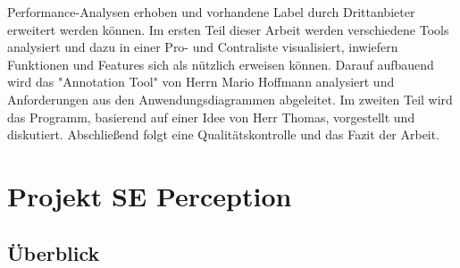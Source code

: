 \documentclass[11pt]{scrartcl}
\begin{document}
                                                                                                                                                                                                                                                                                                                                                                                                                                                                                                                                                                                                                                                                                                                                                                                                                                                                                                                                                      Performance-Analysen erhoben und vorhandene Label durch Drittanbieter erweitert werden können.
Im ersten Teil dieser Arbeit werden verschiedene Tools analysiert und dazu in einer Pro- und Contraliste visualisiert, inwiefern Funktionen und Features sich als nützlich erweisen können. Darauf aufbauend wird das "Annotation Tool" von Herrn Mario Hoffmann analysiert und  Anforderungen aus den Anwendungsdiagrammen abgeleitet. Im zweiten Teil wird das Programm, basierend auf einer Idee von Herr Thomas, vorgestellt und diskutiert. Abschließend folgt eine Qualitätskontrolle und das Fazit der Arbeit.


\newpage
\section{Projekt SE Perception}
\label{sec:Projekt SE Perception}

\subsection{Überblick}
\label{sec:Überblick}
\end{document}
